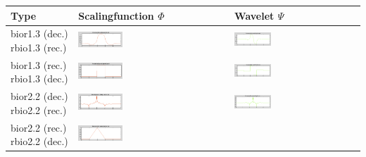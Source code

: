 \begin{center}
	\begin{tabular}{L{0.15\textwidth}||m{0.3\textwidth}|m{0.3\textwidth}}
		Type & Scalingfunction $\Phi$ & Wavelet $\Psi$ \\
		\hline
		bior1.3 (dec.) \newline rbio1.3 (rec.) & 
		\includegraphics[width=0.3\textwidth]{content/Bior13PhiDec.png} &
		\includegraphics[width=0.3\textwidth]{content/Bior13PsiDec.png} \\
		bior1.3 (rec.) \newline rbio1.3 (dec.) & 
		\includegraphics[width=0.3\textwidth]{content/Bior13PhiRec.png} &
		\includegraphics[width=0.3\textwidth]{content/Bior13PsiRec.png} \\
		\hline
		bior2.2 (dec.) \newline rbio2.2 (rec.) & 
		\includegraphics[width=0.3\textwidth]{content/Bior22PhiDec.png} &
		\includegraphics[width=0.3\textwidth]{content/Bior22PsiDec.png} \\
		bior2.2 (rec.) \newline rbio2.2 (dec.) & 
		\includegraphics[width=0.3\textwidth]{content/Bior22PhiRec.png} &

\end{tabular}
\end{center}
